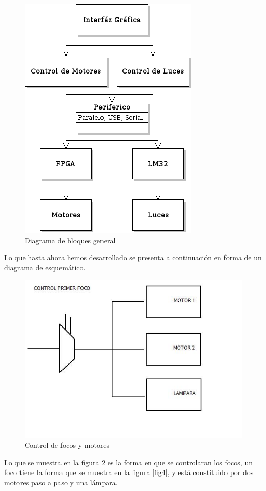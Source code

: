 \documentclass[twocolumn]{IEEEtran}
\begin{document}
\begin{figure}[H]
	\centering
		\includegraphics[scale=0.6]{dia1.png}
	\caption{Diagrama de bloques general}
	\label{fig2}
\end{figure}
\noindent
Lo que hasta ahora hemos desarrollado se presenta a continuación en forma de un diagrama de esquemático.
\begin{figure}[H]
	\centering
		\includegraphics[scale=0.5]{figura2.png}
	\caption{Control de focos y motores}
	\label{fig3}
\end{figure}
\noindent
 Lo que se muestra en la figura \ref{fig3} es la forma en que se controlaran los focos, un foco tiene la forma que se muestra en la figura \ref{fig4}, y está constituido por dos motores paso a paso y una lámpara.\\
\end{document}
